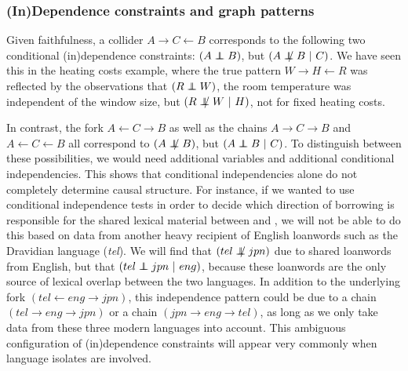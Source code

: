 \subsubsection{(In)Dependence constraints and graph patterns}
Given faithfulness, a collider $A \rightarrow C \leftarrow B$ corresponds to the following two conditional (in)dependence constraints: $(A \independent B)$, but $(A \notindep B\ |\ C)$. We have seen this in the heating costs example, where the true pattern $W \rightarrow H \leftarrow R$ was reflected by the observations that $(R \independent W)$, the room temperature was independent of the window size, but $(R \notindep W\ |\ H)$, not for fixed heating costs.

In contrast, the fork $A \leftarrow C \rightarrow B$ as well as the chains $A \rightarrow C \rightarrow B$ and $A \leftarrow C \leftarrow B$ all correspond to  $(A \notindep B)$, but $(A \independent B\ |\ C)$. To distinguish between these possibilities, we would need additional variables and additional conditional independencies. This shows that conditional independencies alone do not completely determine causal structure. For instance, if we wanted to use conditional independence tests in order to decide which direction of borrowing is responsible for the shared lexical material between  and , we will not be able to do this based on data from another heavy recipient of English loanwords such as the Dravidian language  (\textit{tel}). We will find that $(tel \notindep jpn)$ due to shared loanwords from English, but that $(tel \independent jpn\ |\ eng)$, because these loanwords are the only source of lexical overlap between the two languages. In addition to the 
underlying fork $(tel \leftarrow eng \rightarrow jpn)$, this independence pattern could be due to a chain $(tel \rightarrow eng \rightarrow jpn)$ or a chain $(jpn \rightarrow eng \rightarrow tel)$, as long as we only take data from these three modern languages into account. This ambiguous configuration of (in)dependence constraints will appear very commonly when language isolates are involved.

